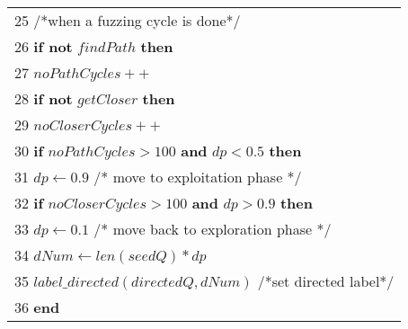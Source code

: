 \documentclass[bachelor]{njupthesis}
\begin{document}
\begin{table}[t]
\begin{tabular}{p{8.4cm}}
25 \quad /*when a fuzzing cycle is done*/ \\
26 \quad \textbf{if not} $findPath$ \textbf{then}\\
27 \quad\quad $noPathCycles ++$\\
28 \quad \textbf{if not} $getCloser$ \textbf{then}\\
29 \quad\quad $noCloserCycles ++ $ \\
30 \quad \textbf{if} \underline{$noPathCycles > 100$} \textbf{and} \underline{$dp < 0.5$} \textbf{then} \\
31 \quad\quad \underline{$dp \leftarrow 0.9 $} \quad /* move to exploitation phase */\\
32 \quad \textbf{if} \underline{$noCloserCycles >100$} \textbf{and} \underline{$dp > 0.9$} \textbf{then} \\
33 \quad\quad \underline{$dp \leftarrow 0.1 $} \quad /* move back to exploration phase */ \\    
34 \quad   $dNum \leftarrow len(seedQ)*dp $\\
35 \quad  $label\_directed(directedQ, dNum)$ \quad /*set directed label*/ \\
36 \textbf{end}   \\
 
\hline
\end{tabular}
\label{algorithm2}
\vspace{-3ex}
\end{table}
\end{document}
